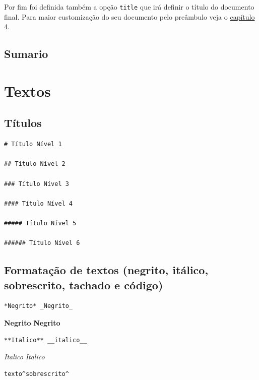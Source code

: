 \documentclass[
]{book}
\begin{document}
Por fim foi definida também a opção \texttt{title} que irá definir o título do documento final. Para maior customização do seu documento pelo preâmbulo veja o \protect\hyperlink{depois-crio}{capítulo 4}.

\hypertarget{sumario}{%
\subsection{Sumario}\label{sumario}}

\hypertarget{textos}{%
\section{Textos}\label{textos}}

\hypertarget{tuxedtulos}{%
\subsection{Títulos}\label{tuxedtulos}}

\begin{verbatim}
# Título Nível 1

## Título Nível 2

### Título Nível 3

#### Título Nível 4

##### Título Nível 5

###### Título Nível 6
\end{verbatim}

\hypertarget{formatauxe7uxe3o-de-textos-negrito-ituxe1lico-sobrescrito-tachado-e-cuxf3digo}{%
\subsection{Formatação de textos (negrito, itálico, sobrescrito, tachado e código)}\label{formatauxe7uxe3o-de-textos-negrito-ituxe1lico-sobrescrito-tachado-e-cuxf3digo}}

\begin{verbatim}
*Negrito* _Negrito_
\end{verbatim}

\textbf{Negrito} \textbf{Negrito}

\begin{verbatim}
**Italico** __italico__
\end{verbatim}

\emph{Italico} \emph{Italico}

\begin{verbatim}
texto^sobrescrito^
\end{verbatim}
\end{document}
